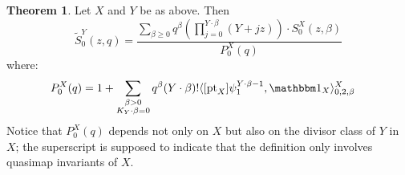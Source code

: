 \documentclass[10pt]{amsart}
\newcommand{\pt}{\operatorname{pt}}
\theoremstyle{definition}
\newtheorem{thm}{Theorem}[section]
\theoremstyle{definition}
\begin{document}
\begin{thm} \label{Theorem Quantum Lefschetz}
Let $X$ and $Y$ be as above. Then
\begin{equation}\label{eqn:mirror}
\tilde{S}_0^Y(z,q) = \dfrac{\sum_{\beta\geq 0} q^\beta \left(\prod_{j=0}^{Y\cdot\beta}(Y+jz)\right) \cdot S_0^X(z,\beta)}{P_0^X(q)}
\end{equation}
where:
\begin{align*}
 P_0^X(q) %
            & = 1 + \sum_{\substack{\beta>0 \\ K_Y\cdot\beta=0}} q^\beta(Y\cdot\beta)!\langle [\pt_X] \psi_1^{Y\cdot\beta-1} ,\mathbbm 1_{X}\rangle_{0,2,\beta}^X
\end{align*}
Notice that $P_0^X(q)$ depends not only on $X$ but also on the divisor class of $Y$ in~$X$; the superscript is supposed to indicate that the definition only involves quasimap invariants of $X$.
\end{thm}
\end{document}
